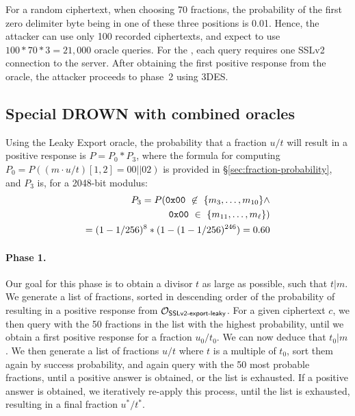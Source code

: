 For a random ciphertext, when choosing 70 fractions, the probability of the
first zero delimiter byte being in one of these three positions is 0.01.
Hence, the attacker can use only 100 recorded ciphertexts, and expect to use
$100 * 70 * 3 = 21,000$ oracle queries. For the \tOracleSSLclear, each
query requires one SSLv2 connection to the server.
After obtaining the first positive response from the oracle, the attacker
proceeds to phase~2 using 3DES.

\subsection{Special DROWN with combined oracles}
\label{sec:special-both}

Using the Leaky Export oracle, the probability that a fraction $u/t$ will result
in a positive response is $P = P_0 * P_3$, where the formula for
computing $P_0 = P((m \cdot u/t)[1,2] = 00||02)$ is provided in \S\ref{sec:fraction-probability},
and $P_3$ is, for a 2048-bit modulus:
\begin{equation}
\begin{aligned}
P_3 = P(
{\tt 0x00} \text{ } \not \in \text{ } \{m_3, \ldots,m_{10}\} \wedge \\
{\tt 0x00} \text{ } \in \text{ } \{m_{11}, \ldots,m_{\ell}\}) \\
 = (1 - 1/256)^{8} * (1 - (1 - 1/256)^{246}) = 0.60
\end{aligned}
\end{equation}


\paragraph{Phase 1.}
Our goal for this phase is to obtain a divisor $t$ as large as possible,
such that $t|m$. We generate a list of
fractions, sorted in descending order of the probability of
resulting in a positive response from $\mathcal{O}_\textsf{SSLv2-export-leaky}$. For a given ciphertext $c$, we then query with
the 50 fractions in the list with the highest probability,
until we obtain a first positive response for a fraction $u_0/t_0$.
We can now deduce that $t_0|m$.
We then generate a list of fractions $u/t$ where $t$ is a multiple of $t_0$, sort them again
by success probability, and again query with the 50 most probable fractions, until a positive answer is obtained,
or the list is exhausted.
If a positive answer is obtained, we iteratively re-apply this process,
until the list is exhausted, resulting in a final fraction $u^*/t^*$.

